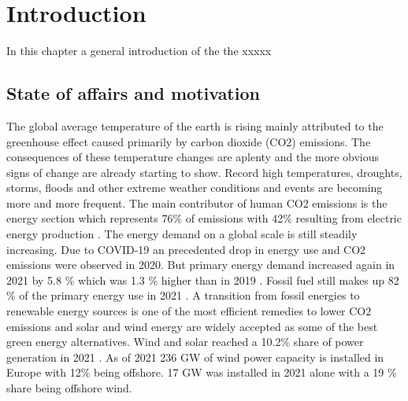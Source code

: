 \section{Introduction} \label{sec:intro}
In this chapter a general introduction of the the xxxxx

\subsection{State of affairs and motivation}
The global average temperature of the earth is rising mainly attributed to the greenhouse effect caused primarily by carbon dioxide (CO2) emissions. The consequences of these temperature changes are aplenty and the more obvious signs of change are already starting to show. Record high temperatures, droughts, storms, floods and other extreme weather conditions and events are becoming more and more frequent. The main contributor of human CO2 emissions is the energy section which represents 76\% of emissions with 42\% resulting from electric energy production \cite{wri2018}. The energy demand on a global scale is still steadily increasing. Due to COVID-19 an precedented drop in energy use and CO2 emissions were observed in 2020. But primary energy demand increased again in 2021 by 5.8 \% which was 1.3 \% higher than in 2019 \cite{bp2022}. Fossil fuel still makes up 82 \% of the primary energy use in 2021 \cite{bp2022}. A transition from fossil energies to renewable energy sources is one of the most efficient remedies to lower CO2 emissions and solar and wind energy are widely accepted as some of the best green energy alternatives. Wind and solar reached a 10.2\% share of power generation in 2021 \cite{bp2022}. As of 2021 236 GW of wind power capacity is installed in Europe with 12\% being offshore. 17 GW was installed in 2021 alone with a 19 \% share being offshore wind\cite{Sesto1992}. \\

